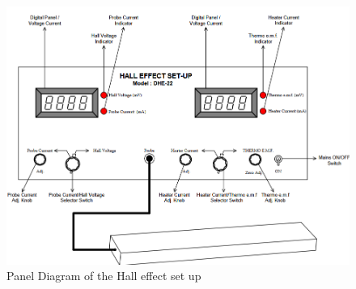 \begin{figure}
    \centering
    \includegraphics[width=1\columnwidth]{images/expt.png}
    \caption{Panel Diagram of the Hall effect set up}
    \label{expt}
\end{figure}